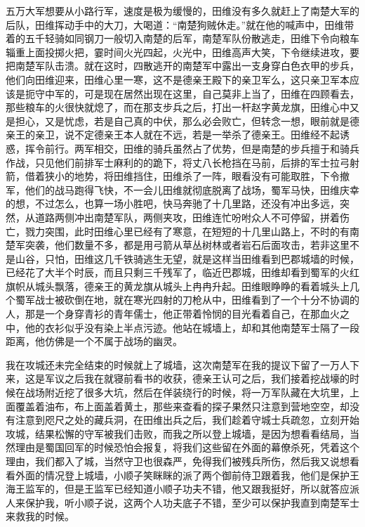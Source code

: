 五万大军想要从小路行军，速度是极为缓慢的，田维没有多久就赶上了南楚大军的后队，田维挥动手中的大刀，大喝道：“南楚狗贼休走。”就在他的喊声中，田维带着的五千轻骑如同钢刀一般切入南楚的后军，南楚军队份散逃走，田维下令向粮车辎重上面投掷火把，霎时间火光四起，火光中，田维高声大笑，下令继续进攻，要把南楚军队击溃。就在这时，四散逃开的南楚军中露出一支身穿白色衣甲的步兵，他们向田维迎来，田维心里一寒，这不是德亲王殿下的亲卫军么，这只亲卫军本应该是扼守中军的，可是现在居然出现在这里，自己莫非上当了，田维在四顾看去，那些粮车的火很快就熄了，而在那支步兵之后，打出一杆赵字黄龙旗，田维心中又是担心，又是忧虑，若是自己真的中伏，那么必会败亡，但转念一想，眼前就是德亲王的亲卫，说不定德亲王本人就在不远，若是一举杀了德亲王。田维经不起诱惑，挥令前行。两军相交，田维的骑兵虽然占了优势，但是南楚的步兵擅于和骑兵作战，只见他们前排军士麻利的的跪下，将丈八长枪挡在马前，后排的军士拉弓射箭，借着狭小的地势，将田维挡住，田维杀了一阵，眼看没有可能取胜，下令撤军，他们的战马跑得飞快，不一会儿田维就彻底脱离了战场，蜀军马快，田维庆幸的想，不过怎么，也算一场小胜吧，快马奔驰了十几里路，还没有冲出多远，突然，从道路两侧冲出南楚军队，两侧夹攻，田维连忙吩咐众人不可停留，拼着伤亡，戮力突围，此时田维心里已经有了寒意，在短短的十几里山路上，不时的有南楚军突袭，他们数量不多，都是用弓箭从草丛树林或者岩石后面攻击，若非这里不是山谷，只怕，田维这几千铁骑逃生无望，就是这样当田维看到巴郡城墙的时候，已经花了大半个时辰，而且只剩三千残军了，临近巴郡城，田维却看到蜀军的火红旗帜从城头飘落，德亲王的黄龙旗从城头上冉冉升起。田维眼睁睁的看着城头上几个蜀军战士被砍倒在地，就在寒光四射的刀枪从中，田维看到了一个十分不协调的人，那是一个身穿青衫的青年儒士，他正带着怜悯的目光看着自己，在那血火之中，他的衣衫似乎没有染上半点污迹。他站在城墙上，却和其他南楚军士隔了一段距离，他仿佛是一个不属于战场的幽灵。

我在攻城还未完全结束的时候就上了城墙，这次南楚军在我的提议下留了一万人下来，这是军议之后我在就寝前看书的收获，德亲王认可之后，我们接着挖战壕的时候在战场附近挖了很多大坑，然后在佯装绕行的时候，将一万军队藏在大坑里，上面覆盖着油布，布上面盖着黄土，那些来查看的探子果然只注意到营地空空，却没有注意到咫尺之处的藏兵洞，在田维出兵之后，我们趁着守城士兵疏忽，立刻开始攻城，结果松懈的守军被我们击败，而我之所以登上城墙，是因为想看看结局，当然理由是蜀国回军的时候恐怕会报复，将我们这些留在外面的幕僚杀死，凭着这个理由，我们都入了城，当然守卫也很森严，免得我们被残兵所伤，然后我又说想看看外面的情况登上城墙，小顺子笑眯眯的派了两个御前侍卫跟着我，他们是保护王海王监军的，但是王监军已经知道小顺子功夫不错，他又跟我挺好，所以就答应派人来保护我，听小顺子说，这两个人功夫底子不错，至少可以保护我直到南楚军士来救我的时候。

